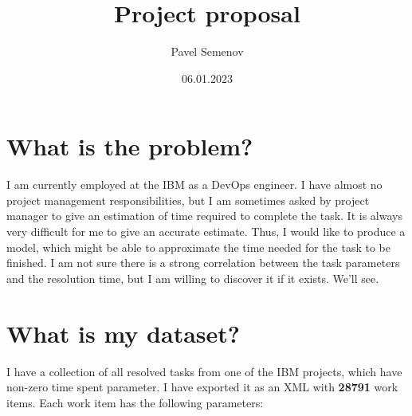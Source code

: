 \documentclass{article}
\title{Project proposal}
\author{Pavel Semenov}
\date{06.01.2023}
\begin{document}
\maketitle

\section*{What is the problem?}

I am currently employed at the IBM as a DevOps engineer. I have almost no project management responsibilities, but
I am sometimes asked by project manager to give an estimation of time required to complete the task. It is always
very difficult for me to give an accurate estimate. Thus, I would like to produce a model, which might be able to
approximate the time needed for the task to be finished. I am not sure there is a strong correlation between the
task parameters and the resolution time, but I am willing to discover it if it exists. We'll see.

\section*{What is my dataset?}

I have a collection of all resolved tasks from one of the IBM projects, which have non-zero time spent parameter.
I have exported it as an XML with \textbf{28791} work items. Each work item has the following parameters:
\end{document}
